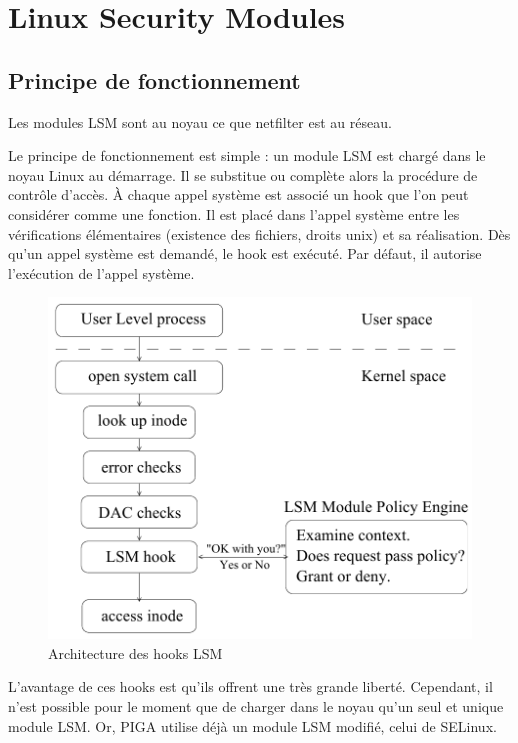 \documentclass[pdftex,a4paper,titlepage,11pt,openright]{article}
\begin{document}
\newpage

\section{Linux Security Modules}

\subsection{Principe de fonctionnement}

Les modules LSM sont au noyau ce que netfilter est au réseau.

Le principe de fonctionnement est simple : un module LSM est chargé dans le noyau Linux au démarrage. Il se substitue ou complète alors la procédure de contrôle d'accès. \`A chaque appel système est associé un hook que l'on peut considérer comme une fonction. Il est placé dans l'appel système entre les vérifications élémentaires (existence des fichiers, droits unix) et sa réalisation. Dès qu'un appel système est demandé, le hook est exécuté. Par défaut, il autorise l'exécution de l'appel système.

\begin{figure}[hb]
	\centering
	\includegraphics[scale=0.45]{lsm1.png}
	\caption{Architecture des hooks LSM \cite{LSMINTRO}}
\end{figure}

L'avantage de ces hooks est qu'ils offrent une très grande liberté. Cependant, il n'est possible pour le moment que de charger dans le noyau qu'un seul et unique module LSM. Or, PIGA utilise déjà un module LSM modifié, celui de SELinux.
\end{document}
